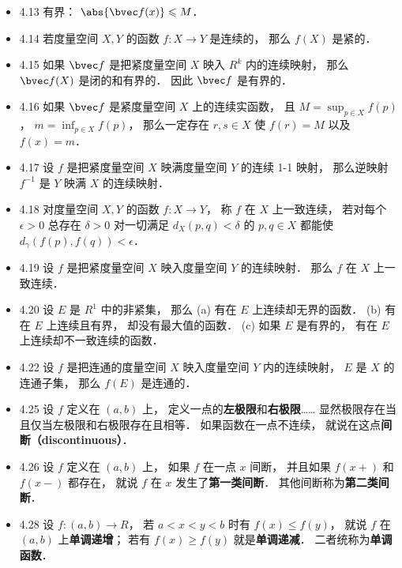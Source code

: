 \begin{itemize}
\item 4.13 有界： $\abs{\bvec f(x)}\leqslant M$．

\item 4.14 若度量空间 $X,Y$ 的函数 $f:X\to Y$ 是连续的， 那么 $f(X)$ 是紧的．

\item 4.15 如果 $\bvec f$ 是把紧度量空间 $X$ 映入 $R^k$ 内的连续映射， 那么 $\bvec f(X)$ 是闭的和有界的． 因此 $\bvec f$ 是有界的．

\item 4.16 如果 $\bvec f$ 是紧度量空间 $X$ 上的连续实函数， 且 $M = \sup_{p\in X} f(p)$， $m=\inf_{p\in X} f(p)$， 那么一定存在 $r,s\in X$ 使 $f(r)=M$ 以及 $f(x)=m$．

\item 4.17 设 $f$ 是把紧度量空间 $X$ 映满度量空间 $Y$ 的连续 1-1 映射， 那么逆映射 $f^{-1}$ 是 $Y$ 映满 $X$ 的连续映射．

\item 4.18 对度量空间 $X,Y$ 的函数 $f:X\to Y$， 称 $f$ 在 $X$ 上一致连续， 若对每个 $\epsilon>0$ 总存在 $\delta >0$ 对一切满足 $d_X(p,q)<\delta$ 的 $p,q\in X$ 都能使 $d_\gamma(f(p),f(q))<\epsilon$．

\item 4.19 设 $f$ 是把紧度量空间 $X$ 映入度量空间 $Y$ 的连续映射． 那么 $f$ 在 $X$ 上一致连续．

\item 4.20 设 $E$ 是 $R^1$ 中的非紧集， 那么 (a) 有在 $E$ 上连续却无界的函数． (b) 有在 $E$ 上连续且有界， 却没有最大值的函数． (c) 如果 $E$ 是有界的， 有在 $E$ 上连续却不一致连续的函数．

\item 4.22 设 $f$ 是把连通的度量空间 $X$ 映入度量空间 $Y$ 内的连续映射， $E$ 是 $X$ 的连通子集， 那么 $f(E)$ 是连通的．

\item 4.25 设 $f$ 定义在 $(a,b)$ 上， 定义一点的\textbf{左极限}和\textbf{右极限}…… 显然极限存在当且仅当左极限和右极限存在且相等． 如果函数在一点不连续， 就说在这点\textbf{间断（discontinuous）}．

\item 4.26 设 $f$ 定义在 $(a,b)$ 上， 如果 $f$ 在一点 $x$ 间断， 并且如果 $f(x+)$ 和 $f(x-)$ 都存在， 就说 $f$ 在 $x$ 发生了\textbf{第一类间断}． 其他间断称为\textbf{第二类间断}．

\item 4.28 设 $f:(a,b)\to R$， 若 $a<x<y<b$ 时有 $f(x)\leqslant f(y)$， 就说 $f$ 在 $(a,b)$ 上\textbf{单调递增}； 若有 $f(x)\geqslant f(y)$ 就是\textbf{单调递减}． 二者统称为\textbf{单调函数}．


\end{itemize}
